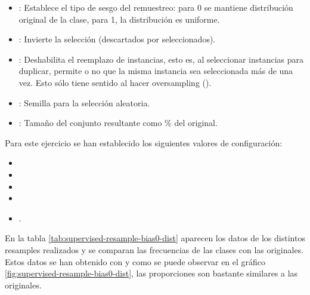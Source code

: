 \begin{itemize}
    \item {}: Establece el tipo de sesgo del remuestreo: para 0 se mantiene distribución original de la clase, para 1, la distribución es uniforme.
    \item {}: Invierte la selección (descartados por seleccionados).
    \item {}: Deshabilita el reemplazo de instancias, esto es, al seleccionar instancias para duplicar, permite o no que la misma instancia sea seleccionada más de una vez. Esto sólo tiene sentido al hacer oversampling ().
    \item {}: Semilla para la selección aleatoria.
    \item {}: Tamaño del conjunto resultante como \% del original.
\end{itemize}

Para este ejercicio se han establecido los siguientes valores de configuración:
\begin {itemize}
    \item {}
    \item {}
    \item {}
    \item {}
    \item {}.
\end{itemize}

En la tabla \ref{tab:supervised-resample-bias0-dist} aparecen los datos de los distintos resamples realizados y se comparan las frecuencias de las clases con las originales. Estos datos se han obtenido con  y como se puede observar en el gráfico \ref{fig:supervised-resample-bias0-dist}, las proporciones son bastante similares a las originales.

